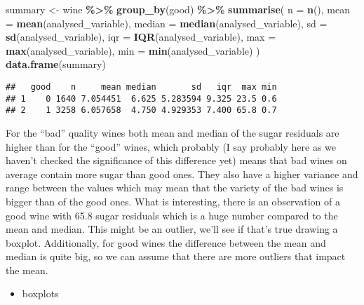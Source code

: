 \documentclass[
]{article}
\newenvironment{Shaded}{\begin{snugshade}}{\end{snugshade}}
\newcommand{\AttributeTok}[1]{\textcolor[rgb]{0.13,0.29,0.53}{#1}}
\newcommand{\FunctionTok}[1]{\textcolor[rgb]{0.13,0.29,0.53}{\textbf{#1}}}
\newcommand{\NormalTok}[1]{#1}
\newcommand{\OtherTok}[1]{\textcolor[rgb]{0.56,0.35,0.01}{#1}}
\newcommand{\SpecialCharTok}[1]{\textcolor[rgb]{0.81,0.36,0.00}{\textbf{#1}}}
\providecommand{\tightlist}{%
  \setlength{\itemsep}{0pt}\setlength{\parskip}{0pt}}
\begin{document}
\begin{Shaded}
\begin{Highlighting}[]
\NormalTok{summary }\OtherTok{\textless{}{-}}\NormalTok{ wine }\SpecialCharTok{\%\textgreater{}\%}
  \FunctionTok{group\_by}\NormalTok{(good) }\SpecialCharTok{\%\textgreater{}\%}
  \FunctionTok{summarise}\NormalTok{(}
    \AttributeTok{n =} \FunctionTok{n}\NormalTok{(),}
    \AttributeTok{mean =} \FunctionTok{mean}\NormalTok{(analysed\_variable),}
    \AttributeTok{median =} \FunctionTok{median}\NormalTok{(analysed\_variable),}
    \AttributeTok{sd =} \FunctionTok{sd}\NormalTok{(analysed\_variable),}
    \AttributeTok{iqr =} \FunctionTok{IQR}\NormalTok{(analysed\_variable),}
    \AttributeTok{max =} \FunctionTok{max}\NormalTok{(analysed\_variable),}
    \AttributeTok{min =} \FunctionTok{min}\NormalTok{(analysed\_variable)}
\NormalTok{  )}
\FunctionTok{data.frame}\NormalTok{(summary)}
\end{Highlighting}
\end{Shaded}

\begin{verbatim}
##   good    n     mean median       sd   iqr  max min
## 1    0 1640 7.054451  6.625 5.283594 9.325 23.5 0.6
## 2    1 3258 6.057658  4.750 4.929353 7.400 65.8 0.7
\end{verbatim}

For the ``bad'' quality wines both mean and median of the sugar
residuals are higher than for the ``good'' wines, which probably (I say
probably here as we haven't checked the significance of this difference
yet) means that bad wines on average contain more sugar than good ones.
They also have a higher variance and range between the values which may
mean that the variety of the bad wines is bigger than of the good ones.
What is interesting, there is an observation of a good wine with 65.8
sugar residuals which is a huge number compared to the mean and median.
This might be an outlier, we'll see if that's true drawing a boxplot.
Additionally, for good wines the difference between the mean and median
is quite big, so we can assume that there are more outliers that impact
the mean.

\begin{itemize}
\tightlist
\item
  boxplots
\end{itemize}
\end{document}
